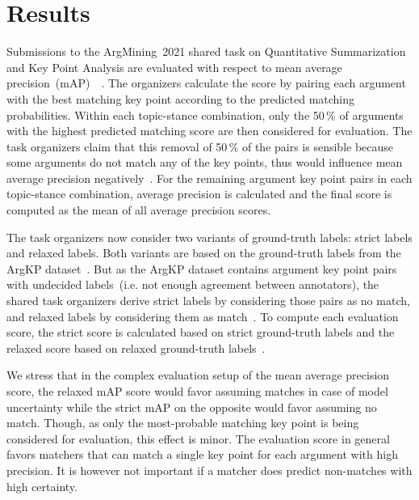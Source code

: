 \section{Results}\label{results}

Submissions to the ArgMining~2021 shared task on Quantitative Summarization and Key Point Analysis are evaluated with respect to mean average precision~(mAP)~\todocite~.
The organizers calculate the score by pairing each argument with the best matching key point according to the predicted matching probabilities.
Within each topic-stance combination, only the 50\,\% of arguments with the highest predicted matching score are then considered for evaluation.
The task organizers claim that this removal of 50\,\% of the pairs is sensible because some arguments do not match any of the key points, thus would influence mean average precision negatively~\todocite.
For the remaining argument key point pairs in each topic-stance combination, average precision is calculated and the final score is computed as the mean of all average precision scores.

The task organizers now consider two variants of ground-truth labels: strict labels and relaxed labels.
Both variants are based on the ground-truth labels from the ArgKP dataset~\cite{Bar-HaimEFKLS2020}. But as the ArgKP dataset contains argument key point pairs with undecided labels~(i.e. not enough agreement between annotators), the shared task organizers derive strict labels by considering those pairs as no match, and relaxed labels by considering them as match~\todocite.
To compute each evaluation score, the strict score is calculated based on strict ground-truth labels and the relaxed score based on relaxed ground-truth labels~\todocite.

We stress that in the complex evaluation setup of the mean average precision score, the relaxed mAP score would favor assuming matches in case of model uncertainty while the strict mAP on the opposite would favor assuming no match.
Though, as only the most-probable matching key point is being considered for evaluation, this effect is minor.
The evaluation score in general favors matchers that can match a single key point for each argument with high precision.
It is however not important if a matcher does predict non-matches with high certainty.

